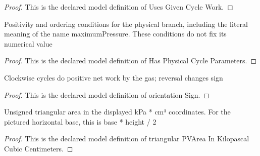 \begin{proof}
  This is the declared model definition of Uses Given Cycle Work.
\end{proof}
\begin{definition}
  \label{def:physics:phyx-mini-0418:phyxminiproblems-problemphyxmini0418-hasphysicalcycleparameters}
  Positivity and ordering conditions for the physical branch, including the literal meaning of the name maximumPressure. These conditions do not fix its numerical value
\end{definition}
\begin{proof}
  This is the declared model definition of Has Physical Cycle Parameters.
\end{proof}
\begin{definition}
  \label{def:physics:phyx-mini-0418:phyxminiproblems-problemphyxmini0418-orientationsign}
  Clockwise cycles do positive net work by the gas; reversal changes sign
\end{definition}
\begin{proof}
  This is the declared model definition of orientation Sign.
\end{proof}
\begin{definition}
  \label{def:physics:phyx-mini-0418:phyxminiproblems-problemphyxmini0418-triangularpvareainkilopascalcubiccentimeters}
  Unsigned triangular area in the displayed kPa * cm³ coordinates. For the pictured horizontal base, this is base * height / 2
\end{definition}
\begin{proof}
  This is the declared model definition of triangular PVArea In Kilopascal Cubic Centimeters.
\end{proof}
